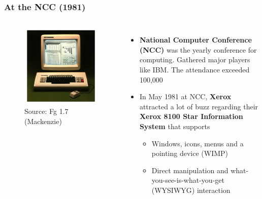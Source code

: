 \documentclass{beamer}
\begin{document}
\begin{frame}
\frametitle{At the NCC (1981)}

\begin{columns}[c] %
	
	\begin{figure}
			\includegraphics[width=1\linewidth]{xerox}
			\caption{Source: Fg 1.7 (Mackenzie)}
	\end{figure}
	
	\begin{itemize}
		\item \textbf{National Computer Conference (NCC) }was the yearly conference for computing.  Gathered major players like IBM.   The attendance exceeded 100,000
		\item In May 1981 at NCC, \textbf{Xerox} attracted a lot of buzz regarding their \textbf{Xerox 8100 Star Information System} that supports
		\begin{itemize}
			\item Windows, icons, menus and a pointing device (WIMP)
			\item  Direct manipulation and what-you-see-is-what-you-get (WYSIWYG) interaction
		\end{itemize}	
	\end{itemize}				
\end{columns}
\end{frame}
\end{document}
